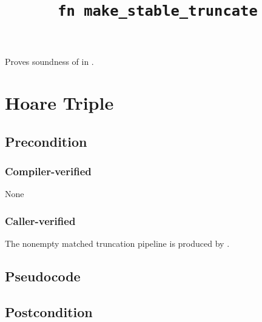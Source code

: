\documentclass{article}
\title{\texttt{fn make\_stable\_truncate}}
\author{\MichaelShoemateAuthor}
\begin{document}
\maketitle


\contrib

Proves soundness of 
in .

\section{Hoare Triple}
\subsection*{Precondition}
\subsubsection*{Compiler-verified}
None

\subsubsection*{Caller-verified}
The nonempty matched truncation pipeline is produced by .

\subsection*{Pseudocode}
\label{sec:python-pseudocode}


\subsection*{Postcondition}
\begin{theorem}
\end{theorem}
\end{document}
